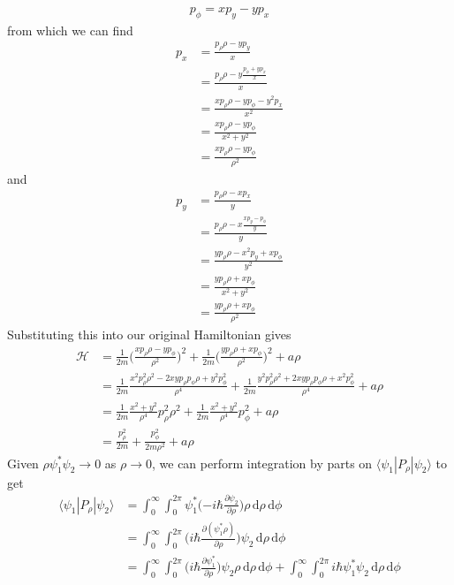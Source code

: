 \documentclass[../principles-of-quantum-mechanics.tex]{subfiles}
\begin{document}
\begin{questions}
\begin{solution}
\begin{align*}
				p_\phi = xp_y - yp_x
			\end{align*}
			from which we can find
			\begin{align*}
				p_x &= \frac{p_\rho\rho - yp_y}{x} \\
				&= \frac{p_\rho\rho - y\frac{p_\phi + yp_x}{x}}{x} \\
				&= \frac{xp_\rho\rho - yp_\phi - y^2p_x}{x^2}\\
				&= \frac{xp_\rho\rho - yp_\phi}{x^2 + y^2} \\
				&= \frac{xp_\rho\rho - yp_\phi}{\rho^2}
			\end{align*}
			and
			\begin{align*}
				p_y &= \frac{p_\rho\rho - xp_x}{y} \\
				&= \frac{p_\rho\rho - x\frac{xp_y - p_\phi}{y}}{y} \\
				&= \frac{yp_\rho\rho - x^2p_y + xp_\phi}{y^2} \\
				&= \frac{yp_\rho\rho + xp_\phi}{x^2 + y^2} \\
				&= \frac{yp_\rho\rho + xp_\phi}{\rho^2}
			\end{align*}
			Substituting this into our original Hamiltonian gives
			\begin{align*}
				\mathcal{H} &= \frac{1}{2m}\Big(\frac{xp_\rho\rho - yp_\phi}{\rho^2}\Big)^2 + \frac{1}{2m}\Big(\frac{yp_\rho\rho + xp_\phi}{\rho^2}\Big)^2 + a\rho \\
				&= \frac{1}{2m}\frac{x^2p_\rho^2\rho^2 - 2xyp_\rho p_\phi \rho + y^2p_\phi^2}{\rho^4} + \frac{1}{2m}\frac{y^2p_\rho^2\rho^2 + 2xyp_\rho p_\phi\rho + x^2p_\phi^2}{\rho^4} + a\rho \\
				&= \frac{1}{2m}\frac{x^2 + y^2}{\rho^4}p_\rho^2\rho^2 + \frac{1}{2m}\frac{x^2 + y^2}{\rho^4}p_\phi^2 + a\rho \\
				&= \frac{p_\rho^2}{2m} + \frac{p_\phi^2}{2m\rho^2} + a\rho
			\end{align*}
			Given $\rho\psi_1^*\psi_2 \to 0$ as $\rho\to 0$, we can perform integration by parts on $\langle \psi_1|P_\rho|\psi_2\rangle$ to get
			\begin{align*}
				\langle \psi_1|P_\rho|\psi_2\rangle &= \int_0^\infty\int_0^{2\pi}\psi_1^*\Big({-i\hbar}\frac{\partial \psi_2}{\partial \rho}\Big)\rho\,\mathrm{d}\rho\,\mathrm{d}\phi \\
				&= \int_0^{\infty}\int_0^{2\pi}\Big({i\hbar}\frac{\partial (\psi_1^*\rho)}{\partial\rho}\Big)\psi_2\,\mathrm{d}\rho\,\mathrm{d}\phi \\
				&= \int_0^{\infty}\int_0^{2\pi}\Big(i\hbar\frac{\partial\psi_1^*}{\partial \rho}\Big)\psi_2\rho\,\mathrm{d}\rho\,\mathrm{d}\phi + \int_0^\infty\int_0^{2\pi}i\hbar\psi_1^*\psi_2\,\mathrm{d}\rho\,\mathrm{d}\phi \\

\end{align*}
\end{solution}
\end{questions}
\end{document}
